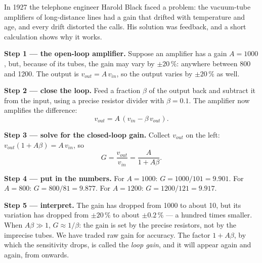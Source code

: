 \begin{example}
\label{ex:intro-black}
In 1927 the telephone engineer Harold Black faced a problem: the vacuum-tube amplifiers of long-distance lines had a gain that drifted with temperature and age, and every drift distorted the calls. His solution was feedback, and a short calculation shows why it works.

\textbf{Step 1 — the open-loop amplifier.} Suppose an amplifier has a gain $A = 1000$, but, because of its tubes, the gain may vary by $\pm20\,\%$: anywhere between 800 and 1200. The output is $v_{out} = A\,v_{in}$, so the output varies by $\pm 20\,\%$ as well.

\textbf{Step 2 — close the loop.} Feed a fraction $\beta$ of the output back and subtract it from the input, using a precise resistor divider with $\beta = 0.1$. The amplifier now amplifies the difference:
\begin{equation*}
  v_{out} = A\,(v_{in} - \beta\,v_{out}).
\end{equation*}

\textbf{Step 3 — solve for the closed-loop gain.} Collect $v_{out}$ on the left: $v_{out}(1 + A\beta) = A\,v_{in}$, so
\begin{equation*}
  G = \frac{v_{out}}{v_{in}} = \frac{A}{1 + A\beta}.
\end{equation*}

\textbf{Step 4 — put in the numbers.} For $A = 1000$: $G = 1000/101 = 9.901$. For $A = 800$: $G = 800/81 = 9.877$. For $A = 1200$: $G = 1200/121 = 9.917$.

\textbf{Step 5 — interpret.} The gain has dropped from 1000 to about 10, but its variation has dropped from $\pm20\,\%$ to about $\pm0.2\,\%$ — a hundred times smaller. When $A\beta \gg 1$, $G \approx 1/\beta$: the gain is set by the precise resistors, not by the imprecise tubes. We have traded raw gain for accuracy. The factor $1 + A\beta$, by which the sensitivity drops, is called the \emph{loop gain}, and it will appear again and again, from  onwards.
\end{example}


